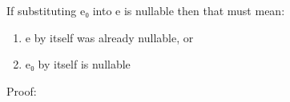 \begin{lemma}\label{lem:null-split}
If substituting e₀ into e is nullable then that must mean:
\begin{enumerate}
\item e  by itself was already nullable, or
\item e₀ by itself is nullable
\end{enumerate}

Proof:

\begin{code}%
\>[0]\AgdaSpace{}%
\AgdaSymbol{:}\AgdaSpace{}%
\AgdaSymbol{(}\AgdaSpace{}%
\AgdaSymbol{:}\AgdaSpace{}%
\AgdaSymbol{)}\AgdaSpace{}%
\AgdaSpace{}%
\AgdaSpace{}%
\AgdaSymbol{(}\AgdaSpace{}%
\AgdaSpace{}%
\AgdaSpace{}%
\AgdaSpace{}%
\AgdaSpace{}%
\AgdaSymbol{)}\AgdaSpace{}%
\AgdaSpace{}%
\AgdaSpace{}%
\AgdaSymbol{(}\AgdaSpace{}%
\AgdaSpace{}%
\AgdaSpace{}%
\AgdaSymbol{)}\AgdaSpace{}%
\AgdaSpace{}%
\AgdaSpace{}%
\AgdaSymbol{(}\AgdaSpace{}%
\AgdaSpace{}%
\AgdaSpace{}%
\AgdaSymbol{)}\<%
\\
\>[0]\AgdaSpace{}%
\AgdaSpace{}%
\AgdaSpace{}%
\AgdaSymbol{=}\AgdaSpace{}%
\AgdaSpace{}%
\<%
\\
\>[0]\AgdaSpace{}%
\AgdaSymbol{(\AgdaUnderscore{}}\AgdaSpace{}%
\AgdaSpace{}%
\AgdaSymbol{)}\AgdaSpace{}%
\AgdaSymbol{(}\AgdaSpace{}%
\AgdaOperator{\AgdaInductiveConstructor{,}}\AgdaSpace{}%
\AgdaSymbol{)}\AgdaSpace{}%
\AgdaSymbol{=}\AgdaSpace{}%
\AgdaSpace{}%
\AgdaSymbol{(}\AgdaSpace{}%
\AgdaOperator{\AgdaInductiveConstructor{,\AgdaUnderscore{}}}\AgdaSymbol{)}\AgdaSpace{}%
\AgdaSymbol{(}\AgdaSpace{}%
\AgdaSpace{}%
\AgdaSymbol{)}\<%
\\
\>[0]\AgdaSpace{}%
\AgdaSymbol{(}\AgdaSpace{}%
\AgdaSpace{}%

\end{code}
\end{lemma}
